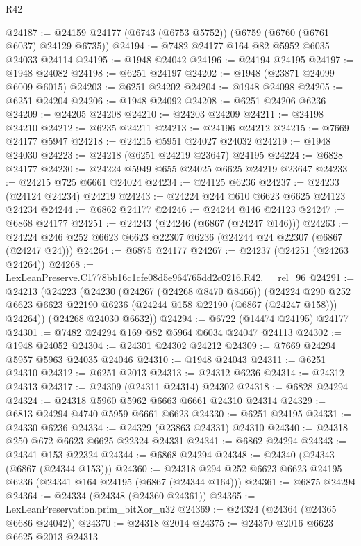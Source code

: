 \begin{lexlean}{R42}
\begin{coremodule}
{@24187 := @24159 @24177 (@6743 (@6753 @5752)) (@6759 (@6760 (@6761 @6037) @24129 @6735))
@24194 := @7482 @24177 @164 @82 @5952 @6035 @24033 @24114
@24195 := @1948 @24042
@24196 := @24194 @24195
@24197 := @1948 @24082
@24198 := @6251 @24197
@24202 := @1948 (@23871 @24099 @6009 @6015)
@24203 := @6251 @24202
@24204 := @1948 @24098
@24205 := @6251 @24204
@24206 := @1948 @24092
@24208 := @6251 @24206 @6236
@24209 := @24205 @24208
@24210 := @24203 @24209
@24211 := @24198 @24210
@24212 := @6235 @24211
@24213 := @24196 @24212
@24215 := @7669 @24177 @5947
@24218 := @24215 @5951 @24027 @24032
@24219 := @1948 @24030
@24223 := @24218 (@6251 @24219 @23647) @24195
@24224 := @6828 @24177
@24230 := @24224 @5949 @655 @24025 @6625 @24219 @23647
@24233 := @24215 @725 @6661 @24024
@24234 := @24125 @6236
@24237 := @24233 (@24124 @24234) @24219
@24243 := @24224 @244 @610 @6623 @6625 @24123 @24234
@24244 := @6862 @24177
@24246 := @24244 @146 @24123
@24247 := @6868 @24177
@24251 := @24243 (@24246 (@6867 (@24247 @146)))
@24263 := @24224 @246 @252 @6623 @6623 @22307 @6236 (@24244 @24 @22307 (@6867 (@24247 @24)))
@24264 := @6875 @24177
@24267 := @24237 (@24251 (@24263 @24264))
@24268 := LexLeanPreserve.C1778bb16c1cfe08d5e964765dd2c0216.R42.__rel_96
@24291 := @24213
    (@24223
      (@24230
        (@24267 (@24268 @8470 @8466))
        (@24224
          @290
          @252
          @6623
          @6623
          @22190
          @6236
          (@24244 @158 @22190 (@6867 (@24247 @158)))
          @24264))
      (@24268 @24030 @6632))
@24294 := @6722 (@14474 @24195) @24177
@24301 := @7482 @24294 @169 @82 @5964 @6034 @24047 @24113
@24302 := @1948 @24052
@24304 := @24301 @24302 @24212
@24309 := @7669 @24294 @5957 @5963 @24035 @24046
@24310 := @1948 @24043
@24311 := @6251 @24310
@24312 := @6251 @2013
@24313 := @24312 @6236
@24314 := @24312 @24313
@24317 := @24309 (@24311 @24314) @24302
@24318 := @6828 @24294
@24324 := @24318 @5960 @5962 @6663 @6661 @24310 @24314
@24329 := @6813 @24294 @4740 @5959 @6661 @6623
@24330 := @6251 @24195
@24331 := @24330 @6236
@24334 := @24329 (@23863 @24331) @24310
@24340 := @24318 @250 @672 @6623 @6625 @22324 @24331
@24341 := @6862 @24294
@24343 := @24341 @153 @22324
@24344 := @6868 @24294
@24348 := @24340 (@24343 (@6867 (@24344 @153)))
@24360 := @24318 @294 @252 @6623 @6623 @24195 @6236 (@24341 @164 @24195 (@6867 (@24344 @164)))
@24361 := @6875 @24294
@24364 := @24334 (@24348 (@24360 @24361))
@24365 := LexLeanPreservation.prim_bitXor_u32
@24369 := @24324 (@24364 (@24365 @6686 @24042))
@24370 := @24318 @2014
@24375 := @24370 @2016 @6623 @6625 @2013 @24313
}
\end{coremodule}
\end{lexlean}
